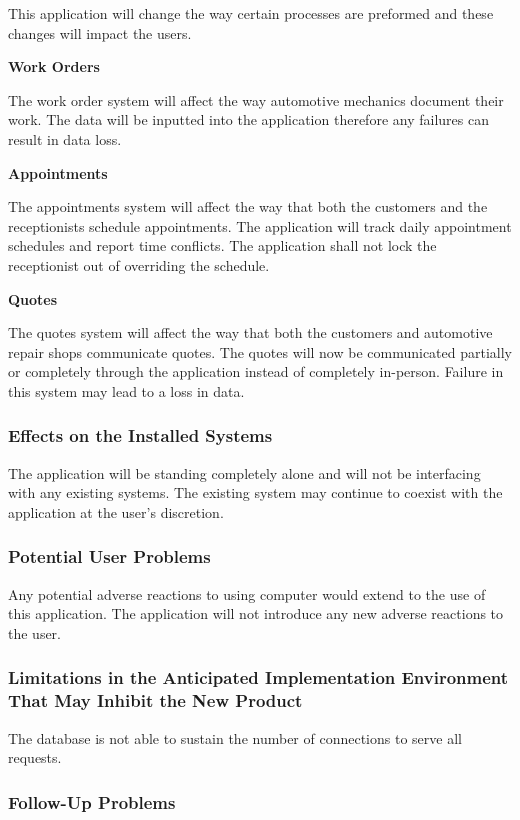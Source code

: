 \documentclass[12pt]{article}
\begin{document}
This application will change the way certain processes are preformed and these changes will impact
the users.

\textbf{Work Orders}

The work order system will affect the way automotive mechanics document their work. The data will
be inputted into the application therefore any failures can result in data loss.

\textbf{Appointments}

The appointments system will affect the way that both the customers and the receptionists schedule
appointments. The application will track daily appointment schedules and report time conflicts. The
application shall not lock the receptionist out of overriding the schedule.

\textbf{Quotes}

The quotes system will affect the way that both the customers and automotive repair shops
communicate quotes. The quotes will now be communicated partially or completely through the
application instead of completely in-person. Failure in this system may lead to a loss in data.

\subsubsection{Effects on the Installed Systems}

The application will be standing completely alone and will not be interfacing with any existing
systems. The existing system may continue to coexist with the application at the user's discretion.

\subsubsection{Potential User Problems}

Any potential adverse reactions to using computer would extend to the use of this application. The
application will not introduce any new adverse reactions to the user.

\subsubsection{Limitations in the Anticipated Implementation Environment That May Inhibit the New Product}

The database is not able to sustain the number of connections to serve all requests.

\subsubsection{Follow-Up Problems}
\end{document}
